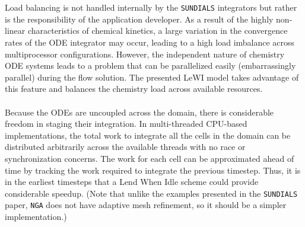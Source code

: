 \documentclass{homework}
\begin{document}
\\ \\ \noindent
Load balancing is not handled internally by the \texttt{SUNDIALS} integrators but rather is the responsibility of the application developer. As a result of the highly non-linear characteristics of chemical kinetics, a large variation in the convergence rates of the ODE integrator may occur, leading to a high load imbalance across multiprocessor configurations. However, the independent nature of chemistry ODE systems leads to a problem that can be parallelized easily (embarrassingly parallel) during the flow solution. The presented LeWI model takes advantage of this feature and balances the chemistry load across available resources.
\\ \\ \noindent
Because the ODEs are uncoupled across the domain, there is considerable freedom in staging their integration. In multi-threaded CPU-based implementations, the total work to integrate all the cells in the domain can be distributed arbitrarily across the available threads with no race or synchronization concerns. The work for each cell can be approximated ahead of time by tracking the work required to integrate the previous timestep. Thus, it is in the earliest timesteps that a Lend When Idle scheme could provide considerable speedup. (Note that unlike the examples \cite{AMReX,PeleC,PeleMP} presented in the \texttt{SUNDIALS} paper, \texttt{NGA} does not have adaptive mesh refinement, so it should be a simpler implementation.)
\end{document}
